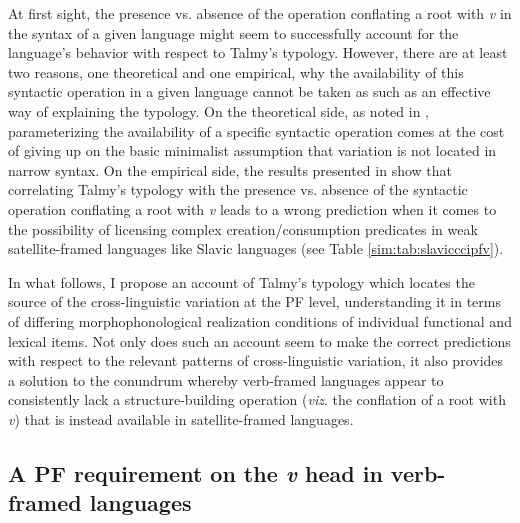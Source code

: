 \documentclass[output=paper,colorlinks,citecolor=brown]{langscibook}
\begin{document}
At first sight, the presence vs. absence of the operation conflating a root with \textit{v} in the syntax of a given language might seem to successfully account for the language's behavior with respect to Talmy's typology. However, there are at least two reasons, one theoretical and one empirical, why the availability of this syntactic operation in a given language cannot be taken as such as an effective way of explaining the typology. On the theoretical side, as noted in \citet{FolliAndHarley2020}, parameterizing the availability of a specific syntactic operation comes at the cost of giving up on the basic minimalist assumption that variation is not located in narrow syntax. On the empirical side, the results presented in  show that correlating Talmy's typology with the presence vs. absence of the syntactic operation conflating a root with \textit{v} leads to a wrong prediction when it comes to the possibility of licensing complex creation/consumption predicates in weak satellite-framed languages like Slavic languages (see Table \ref{sim:tab:slavicccipfv}).

In what follows, I propose an account of Talmy's typology which locates the source of the cross-linguistic variation at the PF level, understanding it in terms of differing morphophonological realization conditions of individual functional and lexical items. Not only does such an account seem to make the correct predictions with respect to the relevant patterns of cross-linguistic variation, it also provides a solution to the conundrum whereby verb-framed languages appear to consistently lack a structure-building operation (\textit{viz}. the conflation of a root with \textit{v}) that is instead available in satellite-framed languages.


\subsection{A PF requirement on the \textit{v} head in verb-framed languages}\label{3.2}
\end{document}
